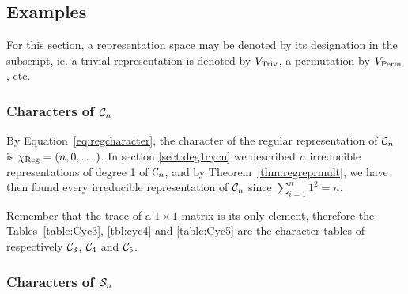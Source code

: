 \subsection{Examples}


\begin{notation}
	For this section, a representation space may be denoted by its designation in the subscript, ie. a trivial representation is denoted 
	by $V_{\text{Triv}}$, a permutation by $V_{\text{Perm}}$, etc.
\end{notation}

\subsubsection{Characters of $\mathcal{C}_n$}

\begin{example}
	By Equation~\ref{eq:regcharacter}, the character of the regular representation of $\mathcal{C}_n$ is $\chi_{\text{Reg}} = (n, 0, \dots)$. In section \ref{sect:deg1cycn} we described $n$ irreducible representations of degree 1 of  $\mathcal{C}_n$, and by Theorem~\ref{thm:regreprmult}, we have then found every irreducible representation of $\mathcal{C}_n$ since $\sum_{i=1}^n 1^2 = n$.
	
	Remember that the trace of a $1 \times 1$ matrix is its only element, therefore the Tables~\ref{table:Cyc3}, \ref{tbl:cyc4} and \ref{table:Cyc5} are the character tables of respectively $\mathcal{C}_3$, $\mathcal{C}_4$ and $\mathcal{C}_5$.
\end{example}

\subsubsection{Characters of $\mathcal{S}_n$}
	
